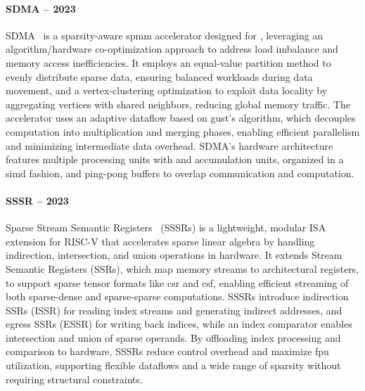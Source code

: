 \paragraph{SDMA -- 2023}

SDMA~\cite{Gao2023_SDMA} is a sparsity-aware \acrshort{spmm} accelerator designed for , leveraging an algorithm/hardware co-optimization approach to address load imbalance and memory access inefficiencies.
It employs an equal-value partition method to evenly distribute sparse data, ensuring balanced workloads during data movement, and a vertex-clustering optimization to exploit data locality by aggregating vertices with shared neighbors, reducing global memory traffic.
The accelerator uses an adaptive dataflow based on \acrlong{gust}'s algorithm, which decouples computation into multiplication and merging phases, enabling efficient parallelism and minimizing intermediate data overhead.
SDMA's hardware architecture features multiple processing units with  and accumulation units, organized in a \acrshort{simd} fashion, and ping-pong buffers to overlap communication and computation.

\paragraph{SSSR -- 2023}

Sparse Stream Semantic Registers~\cite{Scheffler2023_SSSR} (SSSRs) is a lightweight, modular ISA extension for RISC-V that accelerates sparse linear algebra by handling indirection, \gls{intersection}, and union operations in hardware.
It extends Stream Semantic Registers (SSRs), which map memory streams to architectural registers, to support sparse tensor formats like \acrshort{csr} and \acrshort{csf}, enabling efficient streaming of both sparse-dense and sparse-sparse computations.
SSSRs introduce indirection SSRs (ISSR) for reading index streams and generating indirect addresses, and egress SSRs (ESSR) for writing back indices, while an index comparator enables \gls{intersection} and union of sparse operands.
By offloading index processing and comparison to hardware, SSSRs reduce control overhead and maximize \acrfull{fpu} utilization, supporting flexible dataflows and a wide range of sparsity without requiring structural constraints.

